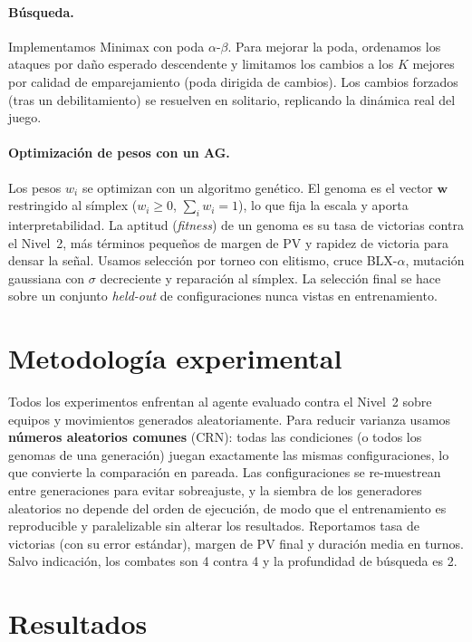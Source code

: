 \documentclass[11pt]{article}
\begin{document}
\paragraph{Búsqueda.} Implementamos Minimax con poda $\alpha$-$\beta$. Para mejorar
la poda, ordenamos los ataques por daño esperado descendente y limitamos los
cambios a los $K$ mejores por calidad de emparejamiento (poda dirigida de
cambios). Los cambios forzados (tras un debilitamiento) se resuelven en solitario,
replicando la dinámica real del juego.

\paragraph{Optimización de pesos con un AG.} Los pesos $w_i$ se optimizan con un
algoritmo genético. El genoma es el vector $\mathbf{w}$ restringido al símplex
($w_i \ge 0$, $\sum_i w_i = 1$), lo que fija la escala y aporta interpretabilidad.
La aptitud (\emph{fitness}) de un genoma es su tasa de victorias contra el
Nivel~2, más términos pequeños de margen de PV y rapidez de victoria para densar
la señal. Usamos selección por torneo con elitismo, cruce BLX-$\alpha$, mutación
gaussiana con $\sigma$ decreciente y reparación al símplex. La selección final se
hace sobre un conjunto \emph{held-out} de configuraciones nunca vistas en
entrenamiento.

\section{Metodología experimental}
\label{sec:metodo}

Todos los experimentos enfrentan al agente evaluado contra el Nivel~2 sobre
equipos y movimientos generados aleatoriamente. Para reducir varianza usamos
\textbf{números aleatorios comunes} (CRN): todas las condiciones (o todos los
genomas de una generación) juegan exactamente las mismas configuraciones, lo que
convierte la comparación en pareada. Las configuraciones se re-muestrean entre
generaciones para evitar sobreajuste, y la siembra de los generadores aleatorios
no depende del orden de ejecución, de modo que el entrenamiento es reproducible y
paralelizable sin alterar los resultados. Reportamos tasa de victorias (con su
error estándar), margen de PV final y duración media en turnos. Salvo indicación,
los combates son 4 contra 4 y la profundidad de búsqueda es 2.

\section{Resultados}
\label{sec:resultados}
\end{document}
